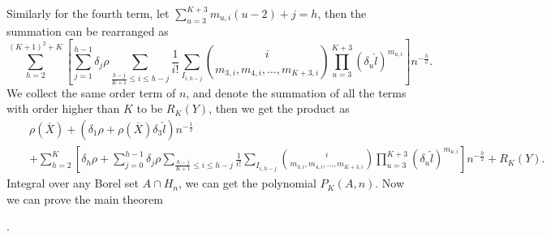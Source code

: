 Similarly for the fourth term, let $\sum_{u=3}^{K+3}m_{u,i}\left(u-2\right)+j=h$,
then the summation can be rearranged as 
\[
\sum_{h=2}^{\left(K+1\right)^{2}+K}\left[\sum_{j=1}^{h-1}\delta_{j}\rho\sum_{\frac{h-j}{K+1}\le i\le h-j}\frac{1}{i!}\sum_{I_{i,h-j}}\binom{i}{m_{3,i},m_{4,i},\ldots,m_{K+3,i}}\prod_{u=3}^{K+3}\left(\delta_{u}\hat{l}\right)^{m_{u,i}}\right]n^{-\frac{h}{2}}.
\]
We collect the same order term of $n$, and denote the summation of
all the terms with order higher than $K$ to be $R_{K}\left(Y\right)$,
then we get the product as 
\begin{eqnarray*}
 &  & \rho\left(\overline{X}\right)+\left(\delta_{1}\rho+\rho\left(\overline{X}\right)\delta_{3}\hat{l}\right)n^{-\frac{1}{2}}\\
 &  & +\sum_{h=2}^{K}\left[\delta_{h}\rho+\sum_{j=0}^{h-1}\delta_{j}\rho\sum_{\frac{h-j}{K+1}\le i\le h-j}\frac{1}{i!}\sum_{I_{i,h-j}}\binom{i}{m_{3,i},m_{4,i},\ldots,m_{K+3,i}}\prod_{u=3}^{K+3}\left(\delta_{u}\hat{l}\right)^{m_{u,i}}\right]n^{-\frac{h}{2}}+R_{K}\left(Y\right).
\end{eqnarray*}
 Integral over any Borel set $A\cap H_{n}$, we can get the polynomial
$P_{K}\left(A,n\right)$. Now we can prove the main theorem %
\begin{comment}
add ref to main theorem
\end{comment}
. 

